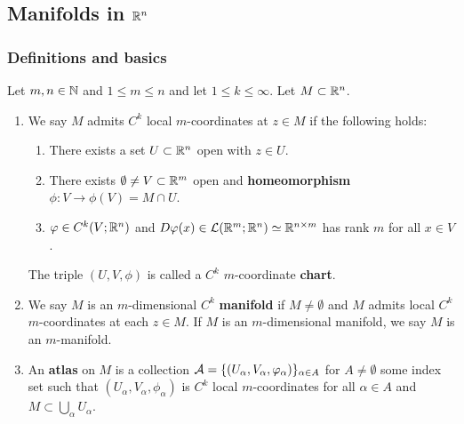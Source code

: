 \documentclass[a4paper]{article}
\begin{document}
\subsection{Manifolds in $\mathbb{R}^n$}

\subsubsection{Definitions and basics}

\begin{defi}
  Let $m, n \in \mathbb{N}$ and $1 \leq m \leq n$ and let $1 \leq k \leq \infty$.
  Let $M \subset \mathbb{R}^n$.
  \begin{enumerate}
    \item We say $M$ admits $C^k$ local $m$-coordinates at $z \in M$ if
          the following holds:
          \begin{enumerate}
            \item There exists a set $U \subset \mathbb{R}^n$ open with $z \in U$.

            \item There exists $\emptyset \neq V \subset \mathbb{R}^m$ open and
                  \textbf{homeomorphism} $\phi : V \to \phi(V) = M \cap
                  U$.

            \item $\varphi \in C^k(V ; \mathbb{R}^n)$ and $D \varphi(x) \in \mathcal{L}(\mathbb{R}^m;
                    \mathbb{R}^n) \simeq \mathbb{R}^{n \times m}$ has rank $m$ for all
                  $x \in V$.
          \end{enumerate}
          The triple $(U, V, \phi)$ is called a $C^k$ $m$-coordinate
          \textbf{chart}.

    \item We say $M$ is an $m$-dimensional $C^k$ \textbf{manifold} if $M
          \neq \emptyset$ and $M$ admits local $C^k$ $m$-coordinates at
          each $z \in M$. If $M$ is an $m$-dimensional manifold, we say
          $M$ is an $m$-manifold.

    \item An \textbf{atlas} on $M$ is a collection $\mathcal{A} = \{(U_\alpha,
          V_\alpha, \varphi_\alpha)\}_{\alpha \in A}$ for $A \neq \emptyset$
          some index set such that $(U_\alpha, V_\alpha, \phi_\alpha)$ is
          $C^k$ local $m$-coordinates for all $\alpha \in A$ and $M
          \subset \bigcup_\alpha U_\alpha$.
  \end{enumerate}
\end{defi}
\end{document}
